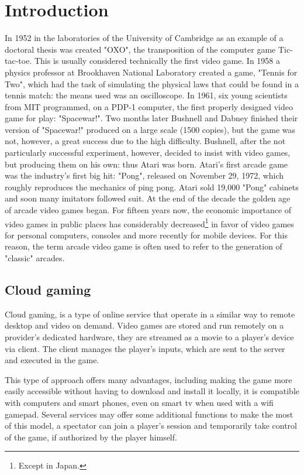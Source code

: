 \chapter{Introduction}
\label{cap:introduction}
In 1952 in the laboratories of the University of Cambridge as an example of a doctoral thesis was created "OXO", the transposition of the computer game Tic-tac-toe. This is usually considered technically the first video game. In 1958 a physics professor at Brookhaven National Laboratory created a game, "Tennis for Two", which had the task of simulating the physical laws that could be found in a tennis match: the means used was an oscilloscope.
In 1961, six young scientists from MIT programmed, on a PDP-1 computer, the first properly designed video game for play: "Spacewar!".
Two months later Bushnell and Dabney finished their version of "Spacewar!" produced on a large scale (1500 copies), but the game was not, however, a great success due to the high difficulty.
Bushnell, after the not particularly successful experiment, however, decided to insist with video games, but producing them on his own: thus Atari was born. Atari's first arcade game was the industry's first big hit: "Pong", released on November 29, 1972, which roughly reproduces the mechanics of ping pong. Atari sold 19,000 "Pong" cabinets and soon many imitators followed suit. At the end of the decade the golden age of arcade video games began.
For fifteen years now, the economic importance of video games in public places has considerably decreased\footnote{Except in Japan.} in favor of video games for personal computers, consoles and more recently for mobile devices. For this reason, the term arcade video game is often used to refer to the generation of "classic" arcades\cite{High_Score}.

\section{Cloud gaming}
Cloud gaming, is a type of online service that operate in a similar way to remote desktop and video on demand. Video games are stored and run remotely on a provider's dedicated hardware, they are streamed as a movie to a player's device via client. The client manages the player's inputs, which are sent to the server and executed in the game.

This type of approach offers many advantages, including making the game more easily accessible without having to download and install it locally, it is compatible with computers and smart phones, even on smart tv when used with a wifi gamepad. Several services may offer some additional functions to make the most of this model, a spectator can join a player's session and temporarily take control of the game, if authorized by the player himself.

